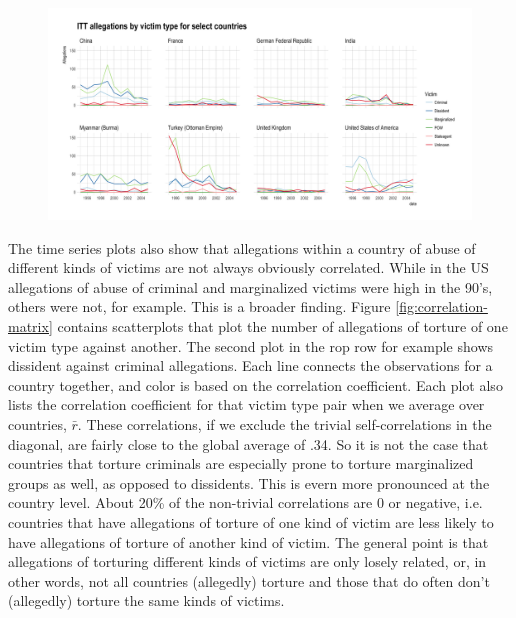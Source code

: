 \documentclass[12pt]{article}
\begin{document}
\begin{figure}
\begin{center}
\caption{}
\label{fig:selected-series}
\includegraphics[width=.99\textwidth]{../output/selected-allegation-counts.png}
\end{center}
\end{figure}

The time series plots also show that allegations within a country of abuse of different kinds of victims are not always obviously correlated. While in the US allegations of abuse of criminal and marginalized victims were high in the 90's, others were not, for example. This is a broader finding. Figure \ref{fig:correlation-matrix} contains scatterplots that plot the number of allegations of torture of one victim type against another. The second plot in the rop row for example shows dissident against criminal allegations. Each line connects the observations for a country together, and color is based on the correlation coefficient. Each plot also lists the correlation coefficient for that victim type pair when we average over countries, $\bar{r}$. These correlations, if we exclude the trivial self-correlations in the diagonal, are fairly close to the global average of .34. So it is not the case that countries that torture criminals are especially prone to torture marginalized groups as well, as opposed to dissidents. This is evern more pronounced at the country level. About 20\% of the non-trivial correlations are 0 or negative, i.e. countries that have allegations of torture of one kind of victim are less likely to have allegations of torture of another kind of victim. The general point is that allegations of torturing different kinds of victims are only losely related, or, in other words, not all countries (allegedly) torture and those that do often don't (allegedly) torture the same kinds of victims. 
\end{document}

